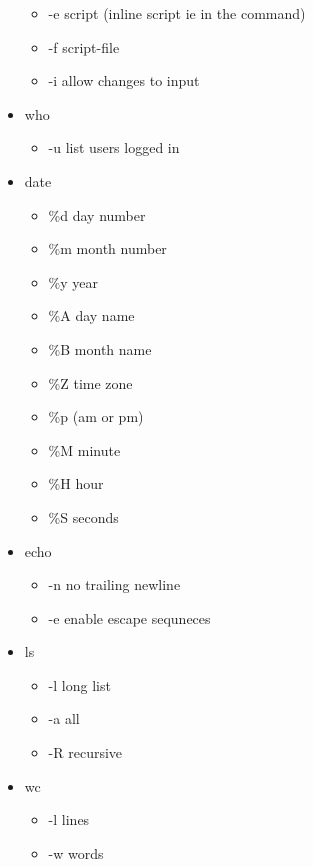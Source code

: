 \documentclass{report}
\begin{document}
\begin{itemize}
\begin{itemize}
                \item -e script (inline script ie in the command)
                \item -f script-file
                \item -i allow changes to input
            \end{itemize}
        \item who
            \begin{itemize}
                \item -u list users logged in 
            \end{itemize}
        \item date
            \begin{itemize}
                \item \%d day number
                \item \%m month number
                \item \%y year
                \item \%A day name
                \item \%B month name
                \item \%Z time zone
                \item \%p (am or pm)
                \item \%M minute
                \item \%H hour
                \item \%S seconds
            \end{itemize}
        \item echo
            \begin{itemize}
                \item -n no trailing newline
                \item -e enable escape sequneces
            \end{itemize}
        \item ls
            \begin{itemize}
                \item -l long list
                \item -a all
                \item -R recursive
            \end{itemize}
        \item wc
            \begin{itemize}
                \item -l lines
                \item -w words

\end{itemize}
\end{itemize}
\end{document}
